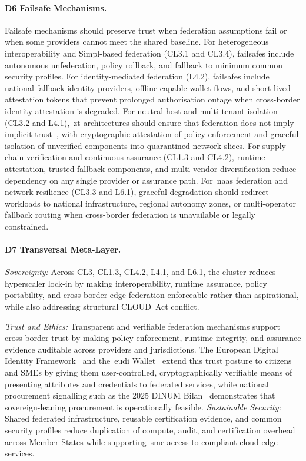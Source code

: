 \documentclass{ieeeaccess}
\begin{document}
\paragraph{D6 Failsafe Mechanisms.}
Failsafe mechanisms should preserve trust when federation assumptions fail or when some providers cannot meet the shared baseline. For heterogeneous interoperability and Simpl-based federation (CL3.1 and CL3.4), failsafes include autonomous unfederation, policy rollback, and fallback to minimum common security profiles. For identity-mediated federation (L4.2), failsafes include national fallback identity providers, offline-capable wallet flows, and short-lived attestation tokens that prevent prolonged authorisation outage when cross-border identity attestation is degraded. For neutral-host and multi-tenant isolation (CL3.2 and L4.1),~\gls{zt} architectures should ensure that federation does not imply implicit trust~\cite{rose2020zta}, with cryptographic attestation of policy enforcement and graceful isolation of unverified components into quarantined network slices. For supply-chain verification and continuous assurance (CL1.3 and CL4.2), runtime attestation, trusted fallback components, and multi-vendor diversification reduce dependency on any single provider or assurance path. For~\gls{naas} federation and network resilience (CL3.3 and L6.1), graceful degradation should redirect workloads to national infrastructure, regional autonomy zones, or multi-operator fallback routing when cross-border federation is unavailable or legally constrained.

\paragraph{D7 Transversal Meta-Layer.}
\emph{Sovereignty:} Across CL3, CL1.3, CL4.2, L4.1, and L6.1, the cluster reduces hyperscaler lock-in by making interoperability, runtime assurance, policy portability, and cross-border edge federation enforceable rather than aspirational, while also addressing structural CLOUD~Act conflict.

\emph{Trust and Ethics:} Transparent and verifiable federation mechanisms support cross-border trust by making policy enforcement, runtime integrity, and assurance evidence auditable across providers and jurisdictions. The European Digital Identity Framework~\cite{eueidas2} and the~\gls{eudi} Wallet~\cite{eudiwallet2026} extend this trust posture to citizens and SMEs by giving them user-controlled, cryptographically verifiable means of presenting attributes and credentials to federated services, while national procurement signalling such as the 2025 DINUM Bilan~\cite{dinum2026bilan} demonstrates that sovereign-leaning procurement is operationally feasible. \emph{Sustainable Security:} Shared federated infrastructure, reusable certification evidence, and common security profiles reduce duplication of compute, audit, and certification overhead across Member States while supporting~\gls{sme} access to compliant cloud-edge services.
\end{document}
